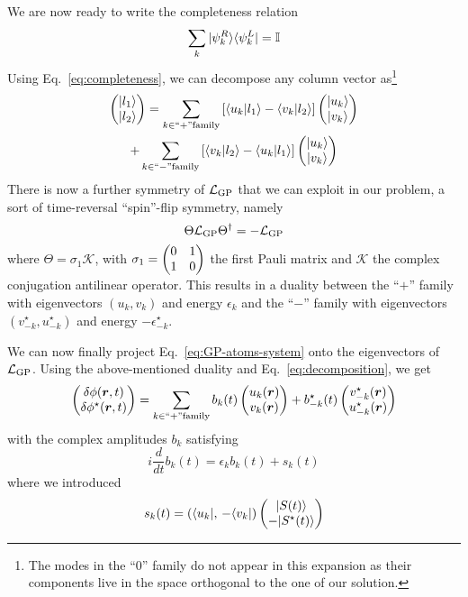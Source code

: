 
We are now ready to write the completeness relation
%
\begin{equation}\label{eq:completeness}
  \sum_k \vert \psi_k^R \rangle \langle \psi_k^L \vert = \mathbb{I}
\end{equation}
% 
Using Eq.~\eqref{eq:completeness}, we can decompose any column vector
as\footnote{The modes in the ``$0$'' family do not appear in this
  expansion as their components live in the space orthogonal to the one
  of our solution.}
%
\begin{multline}\label{eq:decomposition}
  \begin{pmatrix} \vert l_1 \rangle\\ \vert l_2 \rangle \end{pmatrix} = \sum_{k \in ``+" \mbox{\scriptsize family}} \left[\langle u_k \vert l_1 \rangle - \langle v_k \vert l_2 \rangle\right]\begin{pmatrix} \vert u_k \rangle\\ \vert v_k \rangle \end{pmatrix}\\
  + \sum_{k \in ``-" \mbox{\scriptsize family}} \left[\langle v_k \vert l_2 \rangle - \langle u_k \vert l_1 \rangle\right]\begin{pmatrix} \vert u_k \rangle\\ \vert v_k \rangle \end{pmatrix}
\end{multline}
% 
There is now a further symmetry of $\mathcal{L}_{\text{GP}}$ that we can
exploit in our problem, a sort of time-reversal ``spin''-flip
symmetry, namely
%
\begin{equation}\label{eq:symmetry-2}
   \Theta \mathcal{L}_{\text{GP}} \Theta^{\dagger} = -\mathcal{L}_{\text{GP}}
\end{equation}
%
where $\Theta = \sigma_1 \mathcal{K}$, with
$\sigma_1 = \begin{pmatrix} 0 & 1\\ 1 & 0 \end{pmatrix}$ the first Pauli matrix and $\mathcal{K}$
the complex conjugation antilinear operator. This results in a
duality between the ``$+$'' family with eigenvectors $(u_k, v_k)$ and
energy $\epsilon_k$ and the ``$-$'' family with eigenvectors
$(v_{-k}^{\star}, u_{-k}^{\star})$ and energy
$-\epsilon_{-k}^{\star}$.

We can now finally project Eq.~\eqref{eq:GP-atoms-system} onto the
eigenvectors of $\mathcal{L}_{\text{GP}}$. Using the above-mentioned duality and
Eq.~\eqref{eq:decomposition}, we get
%
\begin{equation}\label{eq:phi-column-expansion}
  \begin{pmatrix} \delta\phi(\bm{r},t)\\ \delta\phi^{\star}(\bm{r},t) \end{pmatrix} = \sum_{k \in ``+" \mbox{\scriptsize family}}
  b_k(t) \begin{pmatrix} u_k(\bm{r})\\ v_k(\bm{r}) \end{pmatrix}
  + b_{-k}^{\star}(t) \begin{pmatrix} v_{-k}^{\star}(\bm{r})\\ u_{-k}^{\star}(\bm{r}) \end{pmatrix}
\end{equation}
% 
with the complex amplitudes $b_k$ satisfying 
%
\begin{equation}\label{eq:amplitudes-bk}
  i \frac{d}{dt}b_k(t) = \epsilon_k b_k(t) + s_k(t)
\end{equation}
% 
where we introduced
%
\begin{equation}\label{eq:amplitudes-sk}
  s_k(t) = \left( \langle u_k \vert ,\, -\langle v_k \vert \right) \begin{pmatrix} \vert S(t) \rangle\\ -\vert S^{\star}(t) \rangle \end{pmatrix}
\end{equation}
% 

